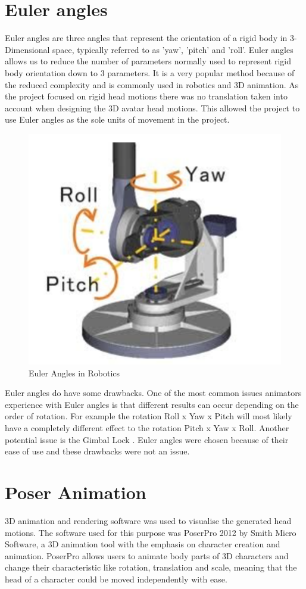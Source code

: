 \documentclass[bsc,frontabs,twoside,singlespacing,parskip]{infthesis}
\begin{document}
\section{Euler angles}

Euler angles are three angles that represent the orientation of a rigid body in 3-Dimensional space, typically referred to as 'yaw', 'pitch' and 'roll'. Euler angles allows us to reduce the number of parameters normally used to represent rigid body orientation down to 3 parameters. It is a very popular method because of the reduced complexity and is commonly used in robotics and 3D animation. As the project focused on rigid head motions there was no translation taken into account when designing the 3D avatar head motions. This allowed the project to use Euler angles as the sole units of movement in the project.

\begin{figure}[h!]
	\centering
	\includegraphics[width=.5\textwidth]{euler_angles.png}
	\caption{Euler Angles in Robotics}
\end{figure}

Euler angles do have some drawbacks. One of the most common issues animators experience with Euler angles is that different results can occur depending on the order of rotation. For example the rotation Roll x Yaw x Pitch will most likely have a completely different effect to the rotation Pitch x Yaw x Roll. \cite{quartionions} Another potential issue is the Gimbal Lock \cite{gimbal}. Euler angles were chosen because of their ease of use and these drawbacks were not an issue.

\section{Poser Animation}

3D animation and rendering software was used to visualise the generated head motions. The software used for this purpose was PoserPro 2012 by Smith Micro Software, a 3D animation tool with the emphasis on character creation and animation. PoserPro allows users to animate body parts of 3D characters and change their characteristic like rotation, translation and scale, meaning that the head of a character could be moved independently with ease.
\end{document}
